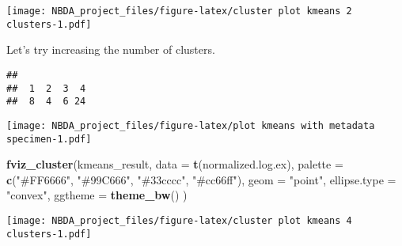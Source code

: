 \documentclass[
]{article}
\newenvironment{Shaded}{\begin{snugshade}}{\end{snugshade}}
\newcommand{\AttributeTok}[1]{\textcolor[rgb]{0.13,0.29,0.53}{#1}}
\newcommand{\CommentTok}[1]{\textcolor[rgb]{0.56,0.35,0.01}{\textit{#1}}}
\newcommand{\DecValTok}[1]{\textcolor[rgb]{0.00,0.00,0.81}{#1}}
\newcommand{\FunctionTok}[1]{\textcolor[rgb]{0.13,0.29,0.53}{\textbf{#1}}}
\newcommand{\NormalTok}[1]{#1}
\newcommand{\OtherTok}[1]{\textcolor[rgb]{0.56,0.35,0.01}{#1}}
\newcommand{\SpecialCharTok}[1]{\textcolor[rgb]{0.81,0.36,0.00}{\textbf{#1}}}
\newcommand{\StringTok}[1]{\textcolor[rgb]{0.31,0.60,0.02}{#1}}
\begin{document}
\texttt{[image: NBDA\_project\_files/figure-latex/cluster plot kmeans 2 clusters-1.pdf]}

Let's try increasing the number of clusters.

\begin{Shaded}
\end{Shaded}

\begin{verbatim}
## 
##  1  2  3  4 
##  8  4  6 24
\end{verbatim}

\begin{Shaded}
\end{Shaded}

\texttt{[image: NBDA\_project\_files/figure-latex/plot kmeans with metadata specimen-1.pdf]}

\begin{Shaded}
\begin{Highlighting}[]
\FunctionTok{fviz\_cluster}\NormalTok{(kmeans\_result, }\AttributeTok{data =} \FunctionTok{t}\NormalTok{(normalized.log.ex),}
             \AttributeTok{palette =} \FunctionTok{c}\NormalTok{(}\StringTok{"\#FF6666"}\NormalTok{, }\StringTok{"\#99C666"}\NormalTok{, }\StringTok{"\#33cccc"}\NormalTok{, }\StringTok{"\#cc66ff"}\NormalTok{), }
             \AttributeTok{geom =} \StringTok{"point"}\NormalTok{,}
             \AttributeTok{ellipse.type =} \StringTok{"convex"}\NormalTok{, }
             \AttributeTok{ggtheme =} \FunctionTok{theme\_bw}\NormalTok{()}
\NormalTok{             )}
\end{Highlighting}
\end{Shaded}

\texttt{[image: NBDA\_project\_files/figure-latex/cluster plot kmeans 4 clusters-1.pdf]}
\end{document}

